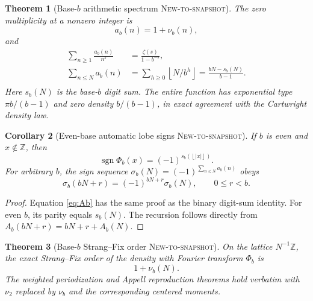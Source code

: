 \documentclass[11pt,oneside]{article}
\numberwithin{equation}{section}
\newtheorem{theorem}{Theorem}[section]
\newtheorem{corollary}[theorem]{Corollary}
\theoremstyle{definition}
\theoremstyle{remark}
\newcommand{\Z}{\mathbb Z}
\newcommand{\sgn}{\operatorname{sgn}}
\newcommand{\floor}[1]{\left\lfloor #1\right\rfloor}
\newcommand{\NewResult}{\textsc{New-to-snapshot}}
\begin{document}
\begin{theorem}[Base-$b$ arithmetic spectrum \NewResult]
\label{thm:baseb}
The zero multiplicity at a nonzero integer is
\begin{equation}
 a_b(n)=1+\nu_b(n),                                       \label{eq:ab}
\end{equation}
and
\begin{align}
 \sum_{n\ge1}\frac{a_b(n)}{n^s}
   &=\frac{\zeta(s)}{1-b^{-s}},                           \label{eq:Db}\\
 \sum_{n\le N}a_b(n)
   &=\sum_{h\ge0}\floor{N/b^h}
     =\frac{bN-s_b(N)}{b-1}.                              \label{eq:Ab}\\
\end{align}
Here $s_b(N)$ is the base-$b$ digit sum.  The entire function has exponential
type $\pi b/(b-1)$ and zero density $b/(b-1)$, in exact agreement with the
Cartwright density law.
\end{theorem}

\begin{corollary}[Even-base automatic lobe signs \NewResult]
If $b$ is even and $x\notin\Z$, then
\begin{equation}
 \sgn\Phi_b(x)=(-1)^{s_b(\floor{|x|})}.                   \label{eq:baseb-sign}
\end{equation}
For arbitrary $b$, the sign sequence
$\sigma_b(N)=(-1)^{\sum_{n\le N}a_b(n)}$ obeys
\begin{equation}
 \sigma_b(bN+r)=(-1)^{bN+r}\sigma_b(N),
 \qquad 0\le r<b.                                         \label{eq:sigmab-rec}
\end{equation}
\end{corollary}

\begin{proof}
Equation \eqref{eq:Ab} has the same proof as the binary digit-sum identity.
For even $b$, its parity equals $s_b(N)$.  The recursion follows directly from
$A_b(bN+r)=bN+r+A_b(N)$.
\end{proof}

\begin{theorem}[Base-$b$ Strang--Fix order \NewResult]
On the lattice $N^{-1}\Z$, the exact Strang--Fix order of the density with
Fourier transform $\Phi_b$ is
\begin{equation}
 1+\nu_b(N).                                               \label{eq:SFb}
\end{equation}
The weighted periodization and Appell reproduction theorems hold verbatim with
$\nu_2$ replaced by $\nu_b$ and the corresponding centered moments.
\end{theorem}
\end{document}
